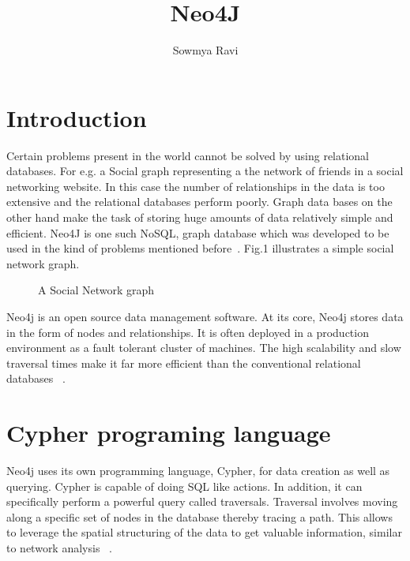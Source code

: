 \documentclass[9pt,twocolumn,twoside]{../../styles/osajnl}
\title{Neo4J}
\author[1]{Sowmya Ravi}
\affil[1]{School of Informatics and Computing, Bloomington, IN 47408, U.S.A.}
\affil[*]{Corresponding authors: sowravi@iu.edu.com}
\begin{document}
\maketitle

\section{Introduction}
Certain problems present in the world cannot be solved by using relational databases. For e.g. a Social graph representing a the network of friends in a social networking website. In this case the number of relationships in the data is too extensive and the relational databases perform poorly. Graph data bases on the other hand make the task of storing huge amounts of data relatively simple and efficient. Neo4J is one such NoSQL, graph database which was developed to be used in the kind of problems mentioned before~\cite{www-neo4j-intro2}. Fig.1 illustrates a simple social network graph.
\begin{figure}[htbp]
\centering
{}
\caption{A Social Network graph ~\cite{www-graph-img}}
\label{fig:false-color}
\end{figure}


Neo4j is an open source data management software. At its core, Neo4j stores data in the form of nodes and relationships. It is often deployed in a production environment as a fault tolerant cluster of machines. The high scalability and slow traversal times make it far more efficient than the conventional relational databases ~\cite{www-neo4j-intro}. 

\section{Cypher programing language}
Neo4j uses its own programming language, 
Cypher, for data creation as well as querying. Cypher is capable of doing SQL like actions. In addition, it can specifically perform a powerful query called traversals. Traversal involves moving along a specific set of nodes in the database thereby tracing a path. This allows to leverage the spatial structuring of the data to get valuable information, similar to network 
analysis ~\cite{www-slideshare}. 
\end{document}
